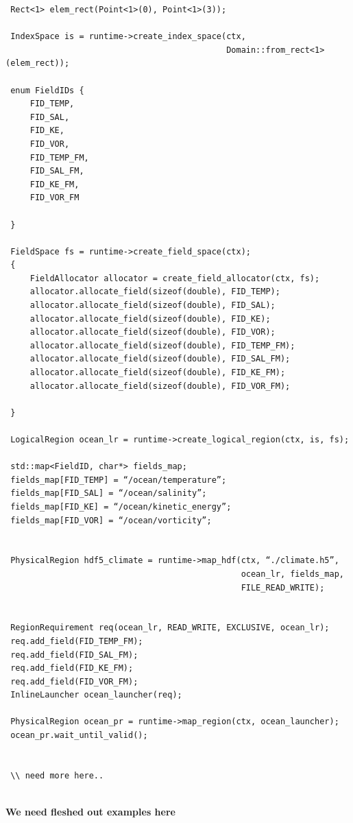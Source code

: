 \documentclass{article}
\begin{document}
 \begin{lstlisting}
 Rect<1> elem_rect(Point<1>(0), Point<1>(3));

 IndexSpace is = runtime->create_index_space(ctx,
                                             Domain::from_rect<1>(elem_rect));
 
 enum FieldIDs {
     FID_TEMP,
     FID_SAL,
     FID_KE,
     FID_VOR,
     FID_TEMP_FM,
     FID_SAL_FM,
     FID_KE_FM,
     FID_VOR_FM
 
 }
 
 FieldSpace fs = runtime->create_field_space(ctx);
 {
     FieldAllocator allocator = create_field_allocator(ctx, fs);
     allocator.allocate_field(sizeof(double), FID_TEMP);
     allocator.allocate_field(sizeof(double), FID_SAL);
     allocator.allocate_field(sizeof(double), FID_KE);
     allocator.allocate_field(sizeof(double), FID_VOR);
     allocator.allocate_field(sizeof(double), FID_TEMP_FM);
     allocator.allocate_field(sizeof(double), FID_SAL_FM);
     allocator.allocate_field(sizeof(double), FID_KE_FM);
     allocator.allocate_field(sizeof(double), FID_VOR_FM);
     
 }
 
 LogicalRegion ocean_lr = runtime->create_logical_region(ctx, is, fs);
 
 std::map<FieldID, char*> fields_map;
 fields_map[FID_TEMP] = “/ocean/temperature”;
 fields_map[FID_SAL] = “/ocean/salinity”;
 fields_map[FID_KE] = “/ocean/kinetic_energy”;
 fields_map[FID_VOR] = “/ocean/vorticity”;
 
 
 PhysicalRegion hdf5_climate = runtime->map_hdf(ctx, “./climate.h5”,
                                                ocean_lr, fields_map,
                                                FILE_READ_WRITE);


 RegionRequirement req(ocean_lr, READ_WRITE, EXCLUSIVE, ocean_lr);
 req.add_field(FID_TEMP_FM);
 req.add_field(FID_SAL_FM);
 req.add_field(FID_KE_FM);
 req.add_field(FID_VOR_FM);
 InlineLauncher ocean_launcher(req);

 PhysicalRegion ocean_pr = runtime->map_region(ctx, ocean_launcher);
 ocean_pr.wait_until_valid();


 \\ need more here.. 
 
 \end{lstlisting}
 

 
 \textbf{We need fleshed out examples here}
 
 
\end{document}
